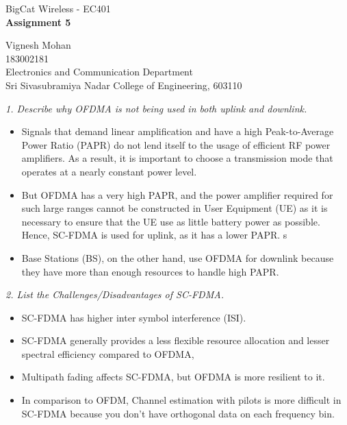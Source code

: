 \documentclass[a4paper]{article}
\begin{document}

\Large
 \begin{center}
BigCat Wireless - EC401\\
\textbf{Assignment 5}

\hspace{10pt}

\large
Vignesh Mohan\\
\smallskip
\small
183002181\\
\small
Electronics and Communication Department\\
\small
Sri Sivasubramiya Nadar College of Engineering, 603110\\
\end{center}

\hspace{10pt}
\normalsize

\textit{1. Describe why OFDMA is not being used in both uplink and downlink.}\\
\begin{itemize}
    \item Signals that demand linear amplification and have a high Peak-to-Average Power Ratio (PAPR) do not lend itself to the usage of efficient RF power amplifiers. As a result, it is important to choose a transmission mode that operates at a nearly constant power level.
    
    \item But OFDMA has a very high PAPR, and the power amplifier required for such large ranges cannot be constructed in User Equipment (UE) as it is necessary to ensure that the UE use as little battery power as possible. Hence, SC-FDMA is used for uplink, as it has a lower PAPR.
    s
    \item Base Stations (BS), on the other hand, use OFDMA for downlink because they have more than enough resources to handle high PAPR.
\end{itemize}

\bigskip

\textit{2. List the Challenges/Disadvantages of SC-FDMA.}\\
\begin{itemize}
  \item SC-FDMA has higher inter symbol interference (ISI).
  \item SC-FDMA generally provides a less flexible resource allocation and lesser spectral efficiency compared to OFDMA,
  \item Multipath fading affects SC-FDMA, but OFDMA is more resilient to it.
  \item In comparison to OFDM, Channel estimation with pilots is more difficult in SC-FDMA because you don't have orthogonal data on each frequency bin.
\end{itemize}
\end{document}
